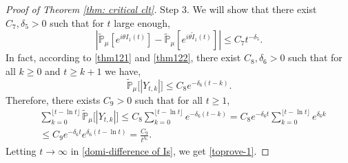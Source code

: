 \documentclass[12pt,a4paper]{amsart}
\theoremstyle{plain}
\theoremstyle{definition}
\numberwithin{equation}{section}
\begin{document}
\begin{proof}[Proof of Theorem \ref{thm: critical clt}]
    Step 3.
    We will show that there exist $C_7, \delta_5> 0$ such that for $t$ large enough,
\begin{equation}\label{domi-difference of Is}
    |\mathbb{\tilde{P}}_{\mu}[e^{i\theta I_1(t)}] - \mathbb{\tilde{P}}_{\mu}[e^{i\theta\tilde{I}_1(t)}]|
    \leq C_7 t^{-\delta_5}.
\end{equation}
    In fact, according to \eqref{thm121} and \eqref{thm122}, there exist $C_8,\delta_6 > 0$ such that
    for all $k \geq 0$ and $t\geq k+1$ we have,
\[
    \tilde{\mathbb P}_\mu\big[|Y_{t,k}|\big]
    \leq C_8 e^{-\delta_6(t-k)}.
\]
   Therefore, there exists $C_9> 0$  such that for all $t \geq 1$,
\begin{align}
    &\sum_{k=0}^{\lfloor t-\ln t \rfloor} \tilde {\mathbb P}_\mu\big[|Y_{t,k}|\big]
    \leq C_8\sum_{k=0}^{\lfloor t-\ln t \rfloor} e^{-\delta_6(t-k)}
    = C_8 e^{-\delta_6 t}\sum_{k=0}^{\lfloor t-\ln t \rfloor} e^{\delta_6 k}
    \\&\leq C_9 e^{-\delta_6 t}e^{\delta_6 (t-\ln t)}
    = \frac{C_9}{t^{\delta_6}}.
\end{align}
    Letting $t\to\infty$ in \eqref{domi-difference of Is}, we get \eqref{toprove-1}.


\end{proof}
\end{document}
